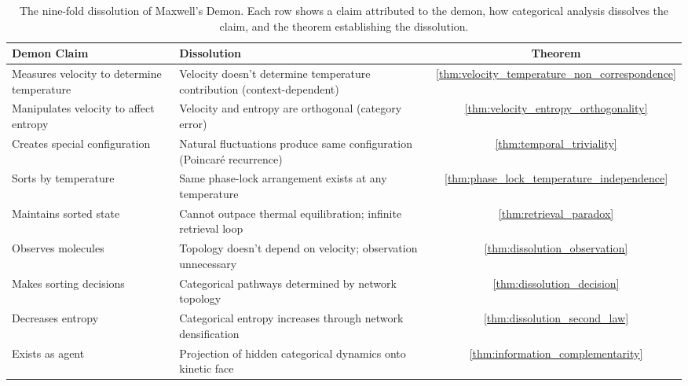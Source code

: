 \documentclass[12pt,a4paper]{article}
\theoremstyle{definition}
\theoremstyle{remark}
\begin{document}
\begin{table}[htbp]
\centering
\begin{tabular}{p{4cm}|p{5cm}|c}
\textbf{Demon Claim} & \textbf{Dissolution} & \textbf{Theorem} \\
\hline
Measures velocity to determine temperature & Velocity doesn't determine temperature contribution (context-dependent) & \ref{thm:velocity_temperature_non_correspondence} \\
\hline
Manipulates velocity to affect entropy & Velocity and entropy are orthogonal (category error) & \ref{thm:velocity_entropy_orthogonality} \\
\hline
Creates special configuration & Natural fluctuations produce same configuration (Poincaré recurrence) & \ref{thm:temporal_triviality} \\
\hline
Sorts by temperature & Same phase-lock arrangement exists at any temperature & \ref{thm:phase_lock_temperature_independence} \\
\hline
Maintains sorted state & Cannot outpace thermal equilibration; infinite retrieval loop & \ref{thm:retrieval_paradox} \\
\hline
Observes molecules & Topology doesn't depend on velocity; observation unnecessary & \ref{thm:dissolution_observation} \\
\hline
Makes sorting decisions & Categorical pathways determined by network topology & \ref{thm:dissolution_decision} \\
\hline
Decreases entropy & Categorical entropy increases through network densification & \ref{thm:dissolution_second_law} \\
\hline
Exists as agent & Projection of hidden categorical dynamics onto kinetic face & \ref{thm:information_complementarity}
\end{tabular}
\caption{The nine-fold dissolution of Maxwell's Demon. Each row shows a claim attributed to the demon, how categorical analysis dissolves the claim, and the theorem establishing the dissolution.}
\label{tab:dissolution_summary}
\end{table}
\end{document}
